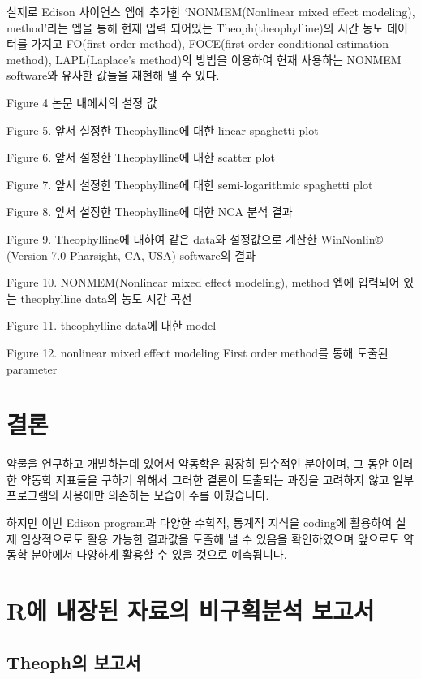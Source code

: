 \documentclass[12pt,]{krantz}
\theoremstyle{definition}
\theoremstyle{definition}
\theoremstyle{definition}
\theoremstyle{remark}
\begin{document}
실제로 Edison 사이언스 엡에 추가한 `NONMEM(Nonlinear mixed effect
modeling), method'라는 엡을 통해 현재 입력 되어있는
Theoph(theophylline)의 시간 농도 데이터를 가지고 FO(first-order method),
FOCE(first-order conditional estimation method), LAPL(Laplace's
method)의 방법을 이용하여 현재 사용하는 NONMEM software와 유사한 값들을
재현해 낼 수 있다.

Figure 4 논문 내에서의 설정 값

Figure 5. 앞서 설정한 Theophylline에 대한 linear spaghetti plot

Figure 6. 앞서 설정한 Theophylline에 대한 scatter plot

Figure 7. 앞서 설정한 Theophylline에 대한 semi-logarithmic spaghetti
plot

Figure 8. 앞서 설정한 Theophylline에 대한 NCA 분석 결과

Figure 9. Theophylline에 대하여 같은 data와 설정값으로 계산한 WinNonlin®
(Version 7.0 Pharsight, CA, USA) software의 결과

Figure 10. NONMEM(Nonlinear mixed effect modeling), method 엡에 입력되어
있는 theophylline data의 농도 시간 곡선

Figure 11. theophylline data에 대한 model

Figure 12. nonlinear mixed effect modeling First order method를 통해
도출된 parameter

\chapter{결론}\label{conclusion}

약물을 연구하고 개발하는데 있어서 약동학은 굉장히 필수적인 분야이며, 그
동안 이러한 약동학 지표들을 구하기 위해서 그러한 결론이 도출되는 과정을
고려하지 않고 일부 프로그램의 사용에만 의존하는 모습이 주를 이뤘습니다.

하지만 이번 Edison program과 다양한 수학적, 통계적 지식을 coding에
활용하여 실제 임상적으로도 활용 가능한 결과값을 도출해 낼 수 있음을
확인하였으며 앞으로도 약동학 분야에서 다양하게 활용할 수 있을 것으로
예측됩니다.

\cleardoublepage

\appendix {}


\chapter{R에 내장된 자료의 비구획분석 보고서}\label{groupreport}

\section{Theoph의 보고서}\label{theophgroup}
\end{document}
